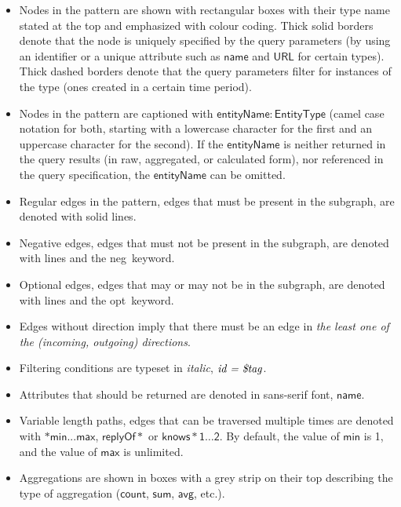\begin{itemize}
	\item Nodes in the pattern are shown with rectangular boxes with their type name stated at the top and emphasized with colour coding.
	Thick solid borders denote that the node is uniquely specified by the query parameters (\eg by using an identifier or a unique attribute such as $\mathsf{name}$ and $\mathsf{URL}$ for certain types). Thick dashed borders denote that the query parameters filter for instances of the type (\eg ones created in a certain time period).
	\item Nodes in the pattern are captioned with $\mathsf{entityName: EntityType}$ (camel case 
	notation for both, starting with a lowercase character for the first and an 
	uppercase character for the second). If the $\mathsf{entityName}$ is neither returned in the query results (in raw, aggregated, or calculated form), nor referenced in the query specification, the $\mathsf{entityName}$ can be omitted.
	\item Regular edges in the pattern, \ie edges that must be present in the subgraph, are denoted with solid lines.
	\item Negative edges, \ie edges that must not be present in the subgraph, are denoted with \textcolor{red}{} lines and the \guillemotleft neg\guillemotright\ keyword.
	\item Optional edges, \ie edges that may or may not be in the subgraph, are denoted with  lines and the \guillemotleft opt\guillemotright\ keyword.
	\item Edges without direction imply that there must be an edge in \emph{the least one of the (incoming, outgoing) directions}.
	\item Filtering conditions are typeset in \textit{italic}, \eg $\textit{id = 
	\textdollar tag}$.
	\item Attributes that should be returned are denoted in sans-serif font, \eg $\mathsf{name}$.
	\item Variable length paths, \ie edges that can be traversed multiple times 
	are denoted with $*\mathsf{min}...\mathsf{max}$, \eg $\mathsf{replyOf}*$ or 
	$\mathsf{knows*1 \ldots 2}$. By default, the value of $\mathsf{min}$ is 1, 
	and the value of $\mathsf{max}$ is unlimited.
	\item Aggregations are shown in boxes with a grey strip on their top describing the type of aggregation ($\mathsf{count}$, $\mathsf{sum}$, $\mathsf{avg}$, etc.).
\end{itemize}

